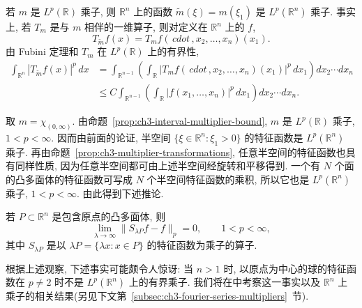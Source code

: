 若 $m$ 是 $L^p(\mathbb R)$ 乘子, 则 $\mathbb R^n$ 上的函数 $\widetilde m(\xi)=m(\xi_1)$ 是 $L^p(\mathbb R^n)$ 乘子. 事实上, 若 $T_m$ 是与 $m$ 相伴的一维算子, 则对定义在 $\mathbb R^n$ 上的 $f$,
\[
 T_{\widetilde m}f(x)=T_mf(\,cdot\,,x_2,\ldots,x_n)(x_1).
\]
由 Fubini 定理和 $T_m$ 在 $L^p(\mathbb R)$ 上的有界性,
\[
\begin{aligned}
 \int_{\mathbb R^n}|T_{\widetilde m}f(x)|^p\,dx
 &=\int_{\mathbb R^{n-1}}
   \left(\int_{\mathbb R}|T_mf(\,cdot\,,x_2,\ldots,x_n)(x_1)|^p\,dx_1\right)
   dx_2\cdots dx_n\\
 &\le C\int_{\mathbb R^{n-1}}
   \left(\int_{\mathbb R}|f(x_1,\ldots,x_n)|^p\,dx_1\right)
   dx_2\cdots dx_n.
\end{aligned}
\]

取 $m=\chi_{(0,\infty)}$. 由命题~\ref{prop:ch3-interval-multiplier-bound}, $m$ 是 $L^p(\mathbb R)$ 乘子, $1<p<\infty$. 因而由前面的论证, 半空间 $\{\xi\in\mathbb R^n:\xi_1>0\}$ 的特征函数是 $L^p(\mathbb R^n)$ 乘子. 再由命题~\ref{prop:ch3-multiplier-transformations}, 任意半空间的特征函数也具有同样性质, 因为任意半空间都可由上述半空间经旋转和平移得到. 一个有 $N$ 个面的凸多面体的特征函数可写成 $N$ 个半空间特征函数的乘积, 所以它也是 $L^p(\mathbb R^n)$ 乘子, $1<p<\infty$. 由此得到下述推论.

\begin{Corollary}
\label{cor:ch3-convex-polyhedron-summability}
若 $P\subset\mathbb R^n$ 是包含原点的凸多面体, 则
\[
 \lim_{\lambda\to\infty}\|S_{\lambda P}f-f\|_p=0,
 \qquad 1<p<\infty,
\]
其中 $S_{\lambda P}$ 是以 $\lambda P=\{\lambda x:x\in P\}$ 的特征函数为乘子的算子.
\end{Corollary}

\hypertarget{chapter-03-page-073}{}
根据上述观察, 下述事实可能颇令人惊讶: 当 $n>1$ 时, 以原点为中心的球的特征函数在 $p\ne2$ 时不是 $L^p(\mathbb R^n)$ 上的有界乘子. 我们将在中考察这一事实以及 $\mathbb R^n$ 上乘子的相关结果(另见下文第~\ref{subsec:ch3-fourier-series-multipliers}~节).
